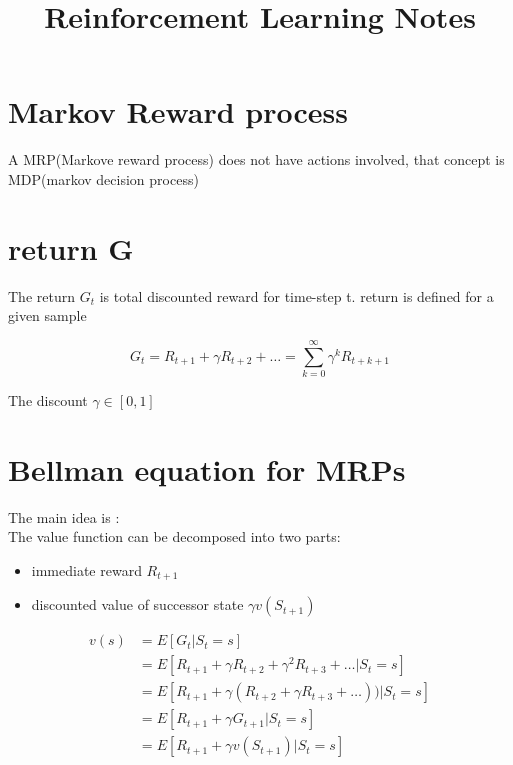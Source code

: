 \documentclass[10pt,a4paper]{article}
\title{Reinforcement Learning Notes}
\begin{document}
\maketitle
	
\section{Markov Reward process}

A MRP(Markove reward process) does not have actions involved, that concept is MDP(markov decision process)

\section{return G}

The return $G_t$ is total discounted reward for time-step t. return is defined for a given sample

\begin{equation}
	G_t = R_{t+1} + \gamma R_{t+2} + \dots = \sum_{k=0}^{\infty} \gamma ^k R_{t+k+1}
\end{equation}

The discount $\gamma \in [0,1]$

\section{Bellman equation for MRPs}

The main idea is :\\

The value function can be decomposed into two parts:
\begin{itemize}
	\item immediate reward $R_{t+1}$
	\item discounted value of successor state $\gamma v(S_{t+1})$
\end{itemize}
	
\begin{equation}
\begin{split}
	v(s) & = E[G_t | S_t = s] \\
& = E[R_{t+1} + \gamma R_{t+2} + \gamma^2 R_{t+3} + \dots | S_t = s] \\
& = E[R_{t+1} + \gamma (R_{t+2} + \gamma R_{t+3} + \dots)) | S_t = s] \\
& = E[R_{t+1} + \gamma G_{t+1} | S_t = s] \\
& = E[R_{t+1} + \gamma v(S_{t+1})| S_t = s] \\
\end{split}
\end{equation}
\end{document}
